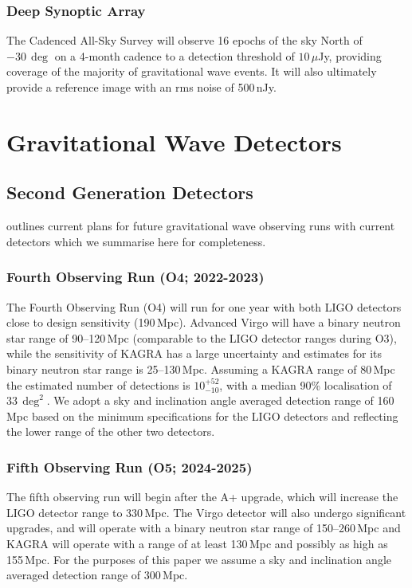 \subsubsection{Deep Synoptic Array}
\vspace{-6pt}
The Cadenced All-Sky Survey \citep{2019BAAS...51g.255H} will observe 16 epochs of the sky North of $-30\,\deg$ on a 4-month cadence to a detection threshold of $10\,\mu$Jy, providing coverage of the majority of gravitational wave events. It will also ultimately provide a reference image with an rms noise of 500\,nJy.

\vspace{-6pt}

\section{Gravitational Wave Detectors}
\vspace{-6pt}
\label{sec:gw_detectors}
\subsection{Second Generation Detectors}
\citet{2018LRR....21....3A} outlines current plans for future gravitational wave observing runs with current detectors which we summarise here for completeness.

\vspace{-10pt}
\subsubsection{Fourth Observing Run (O4; 2022-2023)}
\vspace{-4pt}
The Fourth Observing Run (O4) will run for one year with both LIGO detectors close to design sensitivity (190\,Mpc). Advanced Virgo will have a binary neutron star range of 90--120\,Mpc (comparable to the LIGO detector ranges during O3), while the sensitivity of KAGRA \citep{2019NatAs...3...35K,2020arXiv200802921K} has a large uncertainty and estimates for its binary neutron star range is 25--130\,Mpc. Assuming a KAGRA range of 80\,Mpc the estimated number of detections is $10^{+52}_{-10}$, with a median 90\% localisation of $33\,\deg^2$. We adopt a sky and inclination angle averaged detection range of 160\,Mpc based on the minimum specifications for the LIGO detectors and reflecting the lower range of the other two detectors.


\subsubsection{Fifth Observing Run (O5; 2024-2025)}
The fifth observing run will begin after the A+ upgrade, which will increase the LIGO detector range to 330\,Mpc. The Virgo detector will also undergo significant upgrades, and will operate with a binary neutron star range of 150--260\,Mpc and KAGRA will operate with a range of at least 130\,Mpc and possibly as high as 155\,Mpc. For the purposes of this paper we assume a sky and inclination angle averaged detection range of 300\,Mpc.


